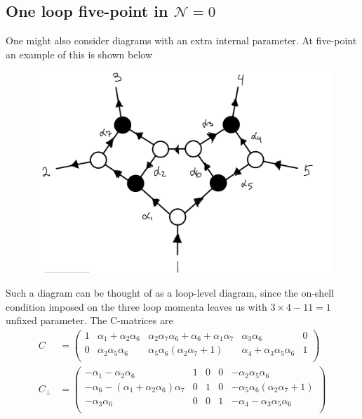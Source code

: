 \documentclass[letter,11pt]{article}
\begin{document}
\subsection{One loop five-point in $\mathcal{N}=0$}
One might also consider diagrams with an extra internal parameter. At five-point an example of this is shown below
\begin{figure}[H]
	\centering
	\includegraphics[width=0.5\linewidth]{5pt3l}
	\caption{}
	\label{fig:5pt3l}
\end{figure}
Such a diagram can be thought of as a loop-level diagram, since the on-shell condition imposed on the three loop momenta leaves us with $3\times 4-11=1$ unfixed parameter. The C-matrices are
\begin{equation}
	\begin{aligned}
		C&=\left(
		\begin{array}{ccccc}
			1 & \alpha _1+\alpha _2 \alpha _6 & \alpha _2 \alpha _7 \alpha _6+\alpha _6+\alpha _1 \alpha _7 & \alpha _3 \alpha _6 & 0 \\
			0 & \alpha _2 \alpha _5 \alpha _6 & \alpha _5 \alpha _6 \left(\alpha _2 \alpha _7+1\right) & \alpha _4+\alpha _3 \alpha _5 \alpha _6 & 1 \\
		\end{array}
		\right)\\
		C_\perp&=\left(
		\begin{array}{ccccc}
			-\alpha _1-\alpha _2 \alpha _6 & 1 & 0 & 0 & -\alpha _2 \alpha _5 \alpha _6 \\
			-\alpha _6-\left(\alpha _1+\alpha _2 \alpha _6\right) \alpha _7 & 0 & 1 & 0 & -\alpha _5 \alpha _6 \left(\alpha _2 \alpha _7+1\right) \\
			-\alpha _3 \alpha _6 & 0 & 0 & 1 & -\alpha _4-\alpha _3 \alpha _5 \alpha _6 \\
		\end{array}
		\right)
	\end{aligned}
\end{equation}
\end{document}
